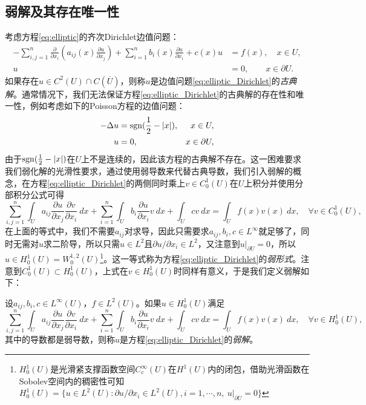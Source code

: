 \documentclass[a4paper,10pt]{ctexart}
\begin{document}
\subsection{弱解及其存在唯一性}
考虑方程\eqref{eq:elliptic}的齐次Dirichlet边值问题：
\begin{equation}\label{eq:elliptic_Dirichlet}
    \begin{aligned}
        -\sum_{i,j=1}^n \frac{\partial}{\partial x_i}\left( a_{ij}(x)\frac{\partial u}{\partial x_j} \right) + \sum_{i=1}^n b_i(x)\frac{\partial u}{\partial x_i} + c(x)u &= f(x),\quad x\in U,\\
        u &= 0,\qquad x\in \partial U.
    \end{aligned}
\end{equation}
如果存在$ u\in C^2(U)\cap C(\overline{U}) $，则称$ u $是边值问题\eqref{eq:elliptic_Dirichlet}的\emph{古典解}。通常情况下，我们无法保证方程\eqref{eq:elliptic_Dirichlet}的古典解的存在性和唯一性，例如考虑如下的Poisson方程的边值问题：
\begin{equation}
    \begin{aligned}
        -\Delta u &= {\rm sgn}(\frac{1}{2}-|x|),&x\in U,\\
        u &= 0,&x\in \partial U,
    \end{aligned}
\end{equation}
由于$ {\rm sgn}(\frac{1}{2}-|x|) $在$ U $上不是连续的，因此该方程的古典解不存在。这一困难要求我们弱化解的光滑性要求，通过使用弱导数来代替古典导数，我们引入弱解的概念，在方程\eqref{eq:elliptic_Dirichlet}的两侧同时乘上$ v\in C^1_0(U) $在$ U $上积分并使用分部积分公式可得
\[
    \sum_{i,j=1}^n \int_U a_{ij}\frac{\partial u}{\partial x_j}\frac{\partial v}{\partial x_i}\ d x + \sum_{i=1}^n \int_Ub_i\dfrac{\partial u}{\partial x_i}v\ dx + \int_U cv\ dx  = \int_U f(x)v(x)\ d x,\quad \forall v\in C_0^1(U),
\]
在上面的等式中，我们不需要$ a_{ij} $对求导，因此只需要求$ a_{ij},b_i,c\in L^\infty $就足够了，同时无需对$ u $求二阶导，所以只需$ u\in L^2 $且$ \partial u / \partial x_i\in L^2 $，又注意到$ u|_{\partial U}=0 $，所以$ u\in H^1_0(U) = W^{1,2}_0(U) $\footnote{$ H^1_0(U) $是光滑紧支撑函数空间$ C^\infty_c(U) $在$ H^1(U) $内的闭包，借助光滑函数在Sobolev空间内的稠密性可知$ H^1_0(U) = \{u\in L^2(U):\partial u / \partial x_i\in L^2(U),i=1,\cdots ,n,\ u|_{\partial U} = 0\} $}。这一等式称为方程\eqref{eq:elliptic_Dirichlet}的\emph{弱形式}。注意到$ C^1_0(U)\subset H^1_0(U) $，上式在$ v\in H^1_0(U) $时同样有意义，于是我们定义弱解如下：
\begin{definition}
    设$ a_{ij},b_i,c\in L^\infty(U) $，$ f\in L^2(U) $。如果$ u\in H^1_0(U) $满足
    \begin{equation}
        \sum_{i,j=1}^n \int_U a_{ij}\frac{\partial u}{\partial x_j}\frac{\partial v}{\partial x_i}\ d x + \sum_{i=1}^n \int_Ub_i\dfrac{\partial u}{\partial x_i}v\ dx + \int_U cv\ dx  = \int_U f(x)v(x)\ d x,\quad \forall v\in H^1_0(U),
    \end{equation}
    其中的导数都是弱导数，则称$ u $是方程\eqref{eq:elliptic_Dirichlet}的\emph{弱解}。
\end{definition}
\end{document}
